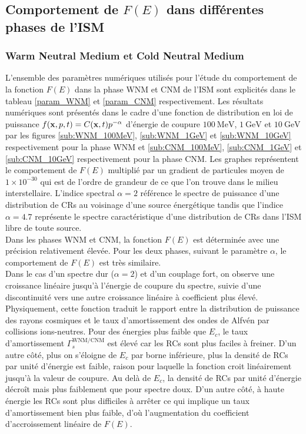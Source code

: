 \documentclass[10pt,a4paper]{article}
\begin{document}
\subsection*{Comportement de $F(E)$ dans différentes phases de l'ISM}

\subsubsection*{Warm Neutral Medium et Cold Neutral Medium}

L'ensemble des paramètres numériques utilisés pour l'étude du comportement de la fonction $F(E)$ dans la phase WNM et CNM de l'ISM sont explicités dans le tableau \ref{param_WNM} et \ref{param_CNM} respectivement. Les résultats numériques sont présentés dans le cadre d'une fonction de distribution en loi de puissance $f(\vb{x}, p, t) = C(\vb{x}, t) p^{-\alpha}$ d'énergie de coupure $100~\mathrm{MeV}$, $1~\mathrm{GeV}$ et $10~\mathrm{GeV}$ par les figures \ref{sub:WNM_100MeV}, \ref{sub:WNM_1GeV} et \ref{sub:WNM_10GeV} respectivement pour la phase WNM et \ref{sub:CNM_100MeV}, \ref{sub:CNM_1GeV} et \ref{sub:CNM_10GeV} respectivement pour la phase CNM. Les graphes représentent le comportement de $F(E)$ multiplié par un gradient de particules moyen de $1\times 10^{-30}$ qui est de l'ordre de grandeur de ce que l'on trouve dans le milieu interstellaire. L'indice spectral $\alpha = 2$ référence le spectre de puissance d'une distribution de CRs au voisinage d'une source énergétique tandis que l'indice $\alpha = 4.7$ représente le spectre caractéristique d'une distribution de CRs dans l'ISM libre de toute source.\\ 

Dans les phases WNM et CNM, la fonction $F(E)$ est déterminée avec une précision relativement élevée. Pour les deux phases, suivant le paramètre $\alpha$, le comportement de $F(E)$ est très similaire. \\ 

Dans le cas d'un spectre dur ($\alpha = 2$) et d'un couplage fort, on observe une croissance linéaire jusqu'à l'énergie de coupure du spectre, suivie d'une discontinuité vers une autre croissance linéaire à coefficient plus élevé. Physiquement, cette fonction traduit le rapport entre la distribution de puissance des rayons cosmiques et le taux d'amortissement des ondes de Alfvén par collisions ions-neutres. Pour des énergies plus faible que $E_c$, le taux d'amortissement $\Gamma^{\mathrm{WNM/CNM}}_{s}$ est élevé car les RCs sont plus faciles à freiner. D'un autre côté, plus on s'éloigne de $E_c$ par borne inférieure, plus la densité de RCs par unité d'énergie est faible, raison pour laquelle la fonction croit linéairement jusqu'à la valeur de coupure. Au delà de $E_c$, la densité de RCs par unité d'énergie décroît mais plus faiblement que pour spectre doux. D'un autre côté, à haute énergie les RCs sont plus difficiles à arrêter ce qui implique un taux d'amortissement bien plus faible, d'où l'augmentation du coefficient d'accroissement linéaire de $F(E)$. \\ 
\end{document}
